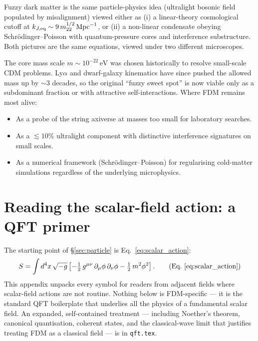 \documentclass[12pt]{article}
\newcommand{\eV}{\,\mathrm{eV}}
\newcommand{\mtwtwo}{m_{22}}
\begin{document}
Fuzzy dark matter is the same particle-physics idea (ultralight
bosonic field populated by misalignment) viewed either as
(i) a linear-theory cosmological cutoff at
$k_{J,{\rm eq}}\sim 9\,\mtwtwo^{1/2}\,{\rm Mpc}^{-1}$, or (ii) a
non-linear condensate obeying Schr\"odinger--Poisson with
quantum-pressure cores and interference substructure.  Both pictures
are the same equations, viewed under two different microscopes.

The core mass scale $m\sim 10^{-22}\eV$ was chosen historically to
resolve small-scale CDM problems.  Ly$\alpha$ and dwarf-galaxy
kinematics have since pushed the allowed mass up by $\sim 3$ decades,
so the original ``fuzzy sweet spot'' is now viable only as a
subdominant fraction or with attractive self-interactions.  Where FDM
remains most alive:
%
\begin{itemize}
  \item As a probe of the string axiverse at masses too small for
        laboratory searches.
  \item As a $\lesssim 10\%$ ultralight component with distinctive
        interference signatures on small scales.
  \item As a numerical framework (Schr\"odinger--Poisson) for
        regularising cold-matter simulations regardless of the
        underlying microphysics.
\end{itemize}

\appendix

\section{Reading the scalar-field action: a QFT primer}
\label{app:qft_primer}

The starting point of \S\ref{sec:particle} is Eq.~\eqref{eq:scalar_action}:
%
\begin{equation}
  S = \int d^4x\,\sqrt{-g}\left[
       -\tfrac{1}{2}\,g^{\mu\nu}\,\partial_\mu\phi\,\partial_\nu\phi
       -\tfrac{1}{2}\,m^2\phi^2
      \right].
  \tag{Eq.~\ref{eq:scalar_action}}
\end{equation}
%
This appendix unpacks every symbol for readers from adjacent fields
where scalar-field actions are not routine.  Nothing below is
FDM-specific --- it is the standard QFT boilerplate that underlies
all the physics of a fundamental scalar field.  An expanded,
self-contained treatment --- including Noether's theorem, canonical
quantisation, coherent states, and the classical-wave limit that
justifies treating FDM as a classical field --- is in
\texttt{qft.tex}.
\end{document}
